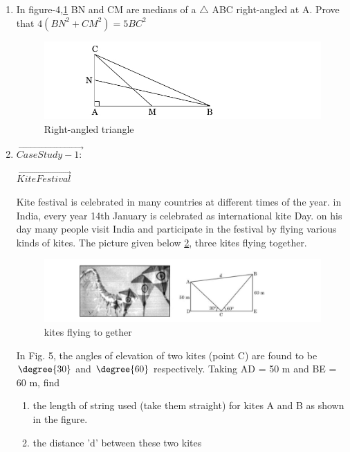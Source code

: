 \begin{enumerate}
\item In figure-4,\ref{fig:rightangled4} BN and CM are medians of a $\triangle$ ABC right-angled at A. Prove that $4(BN^2 +CM^2) = 5BC^2$ 
\begin{figure}[!ht]
\centering
\includegraphics[width=\columnwidth]{figs/rightangled}
\caption{Right-angled triangle}
\label{fig:rightangled4}
\end{figure}
\item $\vec{Case Study - 1:}$
\begin{center}
$\vec{Kite Festival}$\\
\end{center}
Kite festival is celebrated in many countries at different times of the year. in India, every year 14th
January is celebrated as international kite Day. on his day many people visit India and participate in the festival by flying various kinds of kites.
The picture given below \ref{fig:kites5}, three kites flying together.\\
\begin{figure}[!ht]
\centering
\includegraphics[width=\columnwidth]{figs/kites}
\caption{kites flying to gether}
\label{fig:kites5}
\end{figure}
In Fig. 5, the angles of elevation of two kites (point C) are found to be $\degree{30}$ and  $\degree{60}$ respectively. Taking AD = 50 m and BE = 60 m, find 
\begin{enumerate}
\item the length of string used (take them straight) for kites A and B as shown in the figure.
\item the distance 'd' between these two kites
\end{enumerate}
\end{enumerate}

